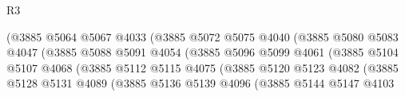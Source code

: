\begin{lexlean}{R3}
\begin{coremodule}
                                          (@3885
                                            @5064
                                            @5067
                                            @4033
                                            (@3885
                                              @5072
                                              @5075
                                              @4040
                                              (@3885
                                                @5080
                                                @5083
                                                @4047
                                                (@3885
                                                  @5088
                                                  @5091
                                                  @4054
                                                  (@3885
                                                    @5096
                                                    @5099
                                                    @4061
                                                    (@3885
                                                      @5104
                                                      @5107
                                                      @4068
                                                      (@3885
                                                        @5112
                                                        @5115
                                                        @4075
                                                        (@3885
                                                          @5120
                                                          @5123
                                                          @4082
                                                          (@3885
                                                            @5128
                                                            @5131
                                                            @4089
                                                            (@3885
                                                              @5136
                                                              @5139
                                                              @4096
                                                              (@3885
                                                                @5144
                                                                @5147
                                                                @4103

\end{coremodule}
\end{lexlean}
